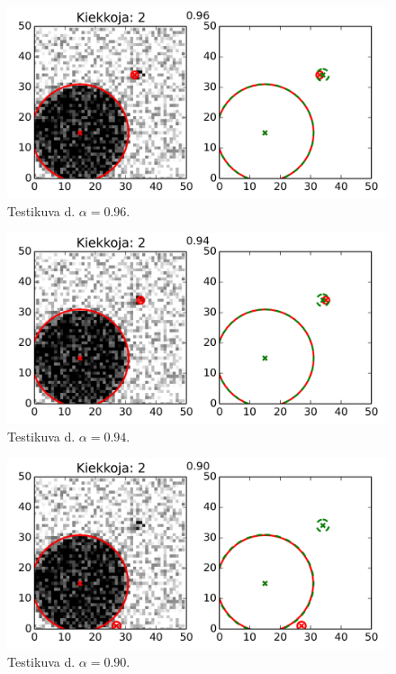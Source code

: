 \begin{figure}[p]
    \centering
    \includegraphics[width=0.7\linewidth]{figures/set2_datasets_res_96.png}
    \caption{Testikuva d. $\alpha = 0.96$.
        \label{fig:set2_datasets_res_96}
    }
\end{figure}


\begin{figure}[p]
    \centering
    \includegraphics[width=0.7\linewidth]{figures/set2_datasets_res_94.png}
    \caption{Testikuva d. $\alpha = 0.94$.
        \label{fig:set2_datasets_res_94}
    }
\end{figure}


\begin{figure}[p]
    \centering
    \includegraphics[width=0.7\linewidth]{figures/set2_datasets_res_90.png}
    \caption{Testikuva d. $\alpha = 0.90$.
        \label{fig:set2_datasets_res_90}
    }
\end{figure}


